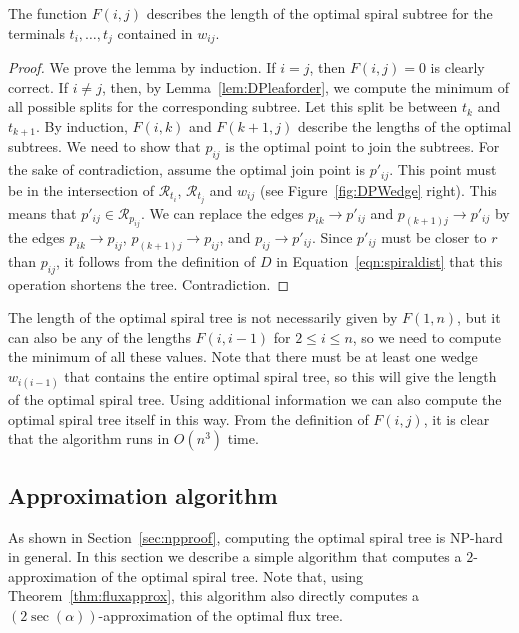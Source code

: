 \documentclass{journalA4}
\begin{document}
\begin{lemma}
The function $F(i, j)$ describes the length of the optimal spiral subtree for the terminals $t_i, \ldots, t_j$ contained in $w_{ij}$.
\end{lemma}
\begin{proof}
We prove the lemma by induction. If $i = j$, then $F(i, j) = 0$ is clearly correct. If $i \neq j$, then, by Lemma~\ref{lem:DPleaforder}, we compute the minimum of all possible splits for the corresponding subtree. Let this split be between $t_k$ and $t_{k+1}$. By induction, $F(i, k)$ and $F(k+1, j)$ describe the lengths of the optimal subtrees. We need to show that $p_{ij}$ is the optimal point to join the subtrees. For the sake of contradiction, assume the optimal join point is $p'_{ij}$. This point must be in the intersection of $\mathcal{R}_{t_i}$, $\mathcal{R}_{t_j}$ and $w_{ij}$ (see Figure~\ref{fig:DPWedge} right). This means that $p'_{ij} \in \mathcal{R}_{p_{ij}}$. We can replace the edges $p_{ik} \rightarrow p'_{ij}$ and $p_{(k+1)j} \rightarrow p'_{ij}$ by the edges $p_{ik} \rightarrow p_{ij}$, $p_{(k+1)j} \rightarrow p_{ij}$, and $p_{ij} \rightarrow p'_{ij}$. Since $p'_{ij}$ must be closer to $r$ than $p_{ij}$, it follows from the definition of $D$ in Equation~\ref{eqn:spiraldist} that this operation shortens the tree. Contradiction.
\end{proof}
The length of the optimal spiral tree is not necessarily given by $F(1, n)$, but it can also be any of the lengths $F(i, i-1)$ for $2 \leq i \leq n$, so we need to compute the minimum of all these values. Note that there must be at least one wedge $w_{i(i-1)}$ that contains the entire optimal spiral tree, so this will give the length of the optimal spiral tree. Using additional information we can also compute the optimal spiral tree itself in this way. From the definition of $F(i, j)$, it is clear that the algorithm runs in $O(n^3)$ time.

\subsection{Approximation algorithm} \label{sec:approximation}

As shown in Section~\ref{sec:npproof}, computing the optimal spiral tree is NP-hard in general. In this section we describe a simple algorithm that computes a $2$-approximation of the optimal spiral tree. Note that, using Theorem~\ref{thm:fluxapprox}, this algorithm also directly computes a $(2 \sec(\alpha))$-approximation of the optimal flux tree.
\end{document}
